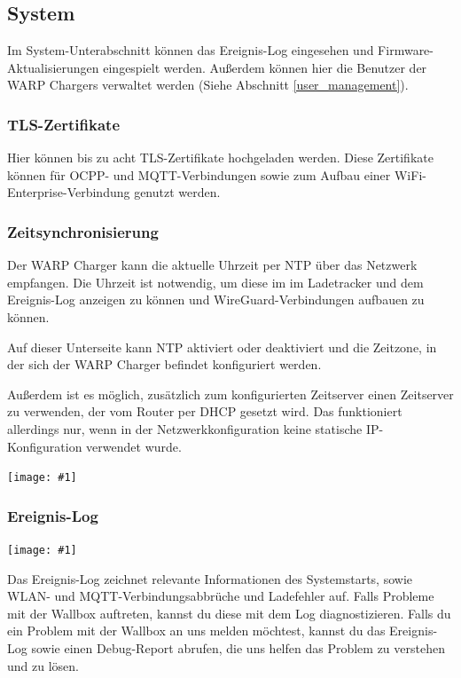 \documentclass[a4paper,10pt]{article}
\newcommand{\gfx}[1]{\texttt{[image: \#1]}}
\begin{document}
\begin{multicols*}{2}
    \subsection{System}
    Im System-Unterabschnitt können das Ereignis-Log eingesehen und
	Firmware-Aktualisierungen eingespielt werden.
    Außerdem können hier die Benutzer der WARP Chargers verwaltet werden (Siehe
    Abschnitt \ref{user_management}).

    \subsubsection{TLS-Zertifikate}\label{tls}
    Hier können bis zu acht TLS-Zertifikate hochgeladen werden. Diese Zertifikate können
    für OCPP- und MQTT-Verbindungen sowie zum Aufbau einer WiFi-Enterprise-Verbindung genutzt werden.

    \subsubsection{Zeitsynchronisierung}\label{ntp}
    Der WARP Charger kann die aktuelle Uhrzeit per NTP über das Netzwerk empfangen.
    Die Uhrzeit ist notwendig, um diese im im Ladetracker und dem Ereignis-Log anzeigen zu können und
    WireGuard-Verbindungen aufbauen zu können.

    Auf dieser Unterseite kann NTP aktiviert oder deaktiviert und die Zeitzone, in der sich
    der WARP Charger befindet konfiguriert werden.

    Außerdem ist es möglich, zusätzlich zum konfigurierten Zeitserver einen Zeitserver zu verwenden, der vom Router per DHCP gesetzt wird. Das funktioniert allerdings nur, wenn in der Netzwerkkonfiguration keine statische IP-Konfiguration verwendet wurde.

    \gfx{./img_warp2/resized/web_ntp}

    \subsubsection{Ereignis-Log}
    \gfx{./img_warp2/resized/web_event_log}

    \newpage
    Das Ereignis-Log zeichnet relevante Informationen des Systemstarts, sowie WLAN- und MQTT-Verbindungsabbrüche und Ladefehler auf.
    Falls Probleme mit der Wallbox auftreten, kannst du diese mit dem Log diagnostizieren.
    Falls du ein Problem mit der Wallbox an uns melden möchtest, kannst du das Ereignis-Log
    sowie einen Debug-Report abrufen, die uns helfen das Problem zu verstehen und zu lösen.


\end{multicols*}
\end{document}
